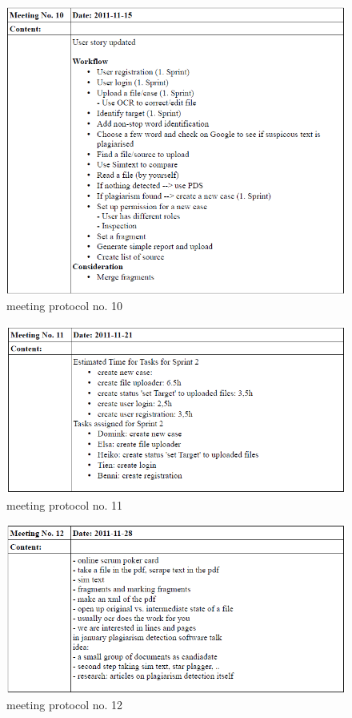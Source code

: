 \begin{appendix}
\begin{figure}[htbp]
  \centering
    \includegraphics[width=\textwidth]{images/a_meetings/meeting_10}
  \caption{meeting protocol no. 10}
  \label{fig:meeting protocol no. 10}
\end{figure}

\begin{figure}[htbp]
  \centering
    \includegraphics[width=\textwidth]{images/a_meetings/meeting_11}
  \caption{meeting protocol no. 11}
  \label{fig:meeting protocol no. 11}
\end{figure}

\begin{figure}[htbp]
  \centering
    \includegraphics[width=\textwidth]{images/a_meetings/meeting_12}
  \caption{meeting protocol no. 12}
  \label{fig:meeting protocol no. 12}
\end{figure}


\end{appendix}
